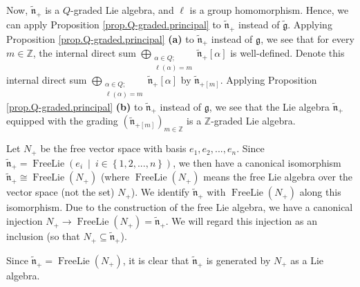 \documentclass[etingof-lie.tex]{subfiles}
\begin{document}
\begin{vershort}
Now, $\widetilde{\mathfrak{n}}_{+}$ is a $Q$-graded Lie algebra, and $\ell$ is
a group homomorphism. Hence, we can apply Proposition
\ref{prop.Q-graded.principal} to $\widetilde{\mathfrak{n}}_{+}$ instead of
$\widetilde{\mathfrak{g}}$. Applying Proposition \ref{prop.Q-graded.principal}
\textbf{(a)} to $\widetilde{\mathfrak{n}}_{+}$ instead of $\mathfrak{g}$, we
see that for every $m\in\mathbb{Z}$, the internal direct sum $\bigoplus
\limits_{\substack{\alpha\in Q;\\\ell\left(  \alpha\right)  =m}%
}\widetilde{\mathfrak{n}}_{+}\left[  \alpha\right]  $ is well-defined. Denote
this internal direct sum $\bigoplus\limits_{\substack{\alpha\in Q;\\\ell
\left(  \alpha\right)  =m}}\widetilde{\mathfrak{n}}_{+}\left[  \alpha\right]
$ by $\widetilde{\mathfrak{n}}_{+\left[  m\right]  }$. Applying Proposition
\ref{prop.Q-graded.principal} \textbf{(b)} to $\widetilde{\mathfrak{n}}_{+}$
instead of $\mathfrak{g}$, we see that the Lie algebra
$\widetilde{\mathfrak{n}}_{+}$ equipped with the grading $\left(
\widetilde{\mathfrak{n}}_{+\left[  m\right]  }\right)  _{m\in\mathbb{Z}}$ is a
$\mathbb{Z}$-graded Lie algebra.

Let $N_{+}$ be the free vector space with basis $e_{1},e_{2},...,e_{n}$. Since
$\widetilde{\mathfrak{n}}_{+}=\operatorname*{FreeLie}\left(  e_{i}\ \mid
\ i\in\left\{  1,2,...,n\right\}  \right)  $, we then have a canonical
isomorphism $\widetilde{\mathfrak{n}}_{+}\cong\operatorname*{FreeLie}\left(
N_{+}\right)  $ (where $\operatorname*{FreeLie}\left(  N_{+}\right)  $ means
the free Lie algebra over the vector space (not the set) $N_{+}$). We identify
$\widetilde{\mathfrak{n}}_{+}$ with $\operatorname*{FreeLie}\left(
N_{+}\right)  $ along this isomorphism. Due to the construction of the free
Lie algebra, we have a canonical injection $N_{+}\rightarrow
\operatorname*{FreeLie}\left(  N_{+}\right)  =\widetilde{\mathfrak{n}}_{+}$.
We will regard this injection as an inclusion (so that $N_{+}\subseteq
\widetilde{\mathfrak{n}}_{+}$).

Since $\widetilde{\mathfrak{n}}_{+}=\operatorname*{FreeLie}\left(
N_{+}\right)  $, it is clear that $\widetilde{\mathfrak{n}}_{+}$ is generated
by $N_{+}$ as a Lie algebra.


\end{vershort}
\end{document}
